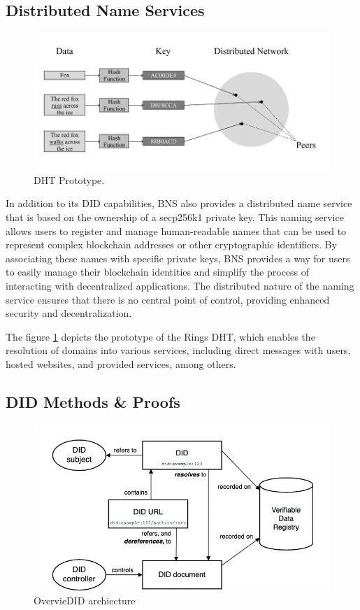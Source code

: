 \documentclass[twocolumn]{article}
\begin{document}
\subsection{Distributed Name Services}
\begin{figure}[H]
  \label{dht}
  \includegraphics[width=\linewidth]{imgs/1.png}
  \caption{DHT Prototype.}
\end{figure}

In addition to its DID capabilities, BNS also provides a distributed name service that is based on the ownership of a secp256k1 private key. This naming service allows users to register and manage human-readable names that can be used to represent complex blockchain addresses or other cryptographic identifiers. By associating these names with specific private keys, BNS provides a way for users to easily manage their blockchain identities and simplify the process of interacting with decentralized applications. The distributed nature of the naming service ensures that there is no central point of control, providing enhanced security and decentralization.

The figure \ref{dht} depicts the prototype of the Rings DHT, which enables the resolution of domains into various services, including direct messages with users, hosted websites, and provided services, among others.



\subsection{DID Methods \& Proofs}
\begin{figure}[H]
  \label{arch}
  \includegraphics[width=\linewidth]{imgs/arch.png}
  \caption{OvervieDID archiecture}
\end{figure}
\end{document}
